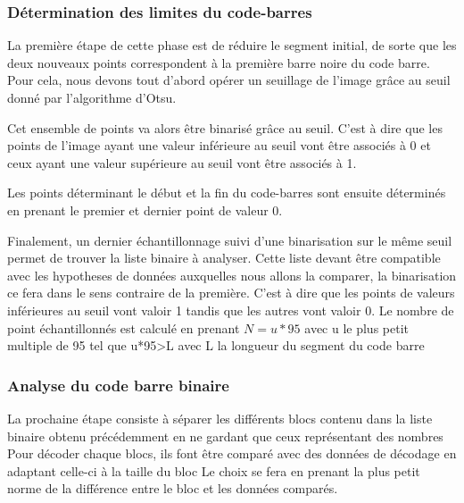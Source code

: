 \documentclass{rapport}
\begin{document}
\subsubsection*{Détermination des limites du code-barres}
La première étape de cette phase est de réduire le segment initial, de sorte que les deux nouveaux points correspondent à la première barre noire du code barre.
Pour cela, nous devons tout d'abord opérer un seuillage de l'image grâce au seuil donné par l'algorithme d'Otsu.

Cet ensemble de points va alors être binarisé grâce au seuil. C'est à dire que les points de l'image ayant une valeur inférieure au seuil vont être associés à 0 et ceux ayant une valeur supérieure au seuil vont être associés à 1.

Les points déterminant le début et la fin du code-barres sont ensuite déterminés en prenant le premier et dernier point de valeur 0.

Finalement, un dernier échantillonnage suivi d'une binarisation sur le même seuil permet de trouver la liste binaire à analyser. Cette liste devant être compatible avec les hypotheses de données auxquelles nous allons la comparer, la binarisation ce fera dans le sens contraire de la première.
C'est à dire que les points de valeurs inférieures au seuil vont valoir 1 tandis que les autres vont valoir 0.
Le nombre de point échantillonnés est calculé en prenant $N=u*95$ avec u le plus petit multiple de 95 tel que u*95>L avec L la longueur du segment du code barre

\subsubsection*{Analyse du code barre binaire}
La prochaine étape consiste à séparer les différents blocs contenu dans la liste binaire obtenu précédemment en ne gardant que ceux représentant des nombres
Pour décoder chaque blocs, ils font être comparé avec des données de décodage en adaptant celle-ci à la taille du bloc 
Le choix se fera en prenant la plus petit norme de la différence entre le bloc et les données comparés.
\end{document}
